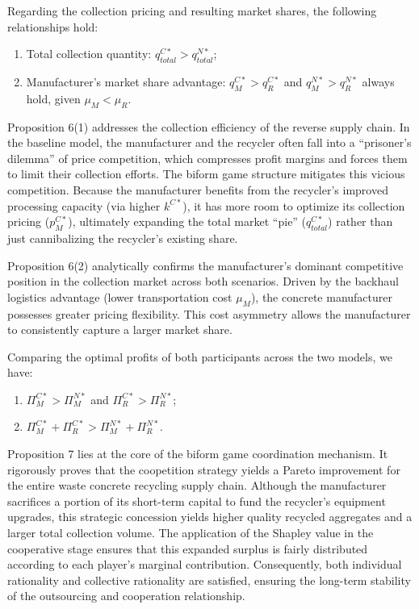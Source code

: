 \documentclass[authoryear,preprint,review,times,10pt]{elsarticle}
\begin{document}
\begin{prop}
\label{prop:pricing_comparison}
Regarding the collection pricing and resulting market shares, the following relationships hold:
\begin{enumerate}[label={(\arabic*)}]
\item Total collection quantity: $q_{total}^{C*} > q_{total}^{N*}$;
\item Manufacturer's market share advantage: $q_{M}^{C*} > q_{R}^{C*}$ and $q_{M}^{N*} > q_{R}^{N*}$ always hold, given $\mu_{M} < \mu_{R}$.
\end{enumerate}
\end{prop}

Proposition 6(1) addresses the collection efficiency of the reverse supply chain. In the baseline model, the manufacturer and the recycler often fall into a ``prisoner's dilemma'' of price competition, which compresses profit margins and forces them to limit their collection efforts. The biform game structure mitigates this vicious competition. Because the manufacturer benefits from the recycler's improved processing capacity (via higher $k^{C*}$), it has more room to optimize its collection pricing ($p_{M}^{C*}$), ultimately expanding the total market ``pie'' ($q_{total}^{C*}$) rather than just cannibalizing the recycler's existing share.

Proposition 6(2) analytically confirms the manufacturer's dominant competitive position in the collection market across both scenarios. Driven by the backhaul logistics advantage (lower transportation cost $\mu_{M}$), the concrete manufacturer possesses greater pricing flexibility. This cost asymmetry allows the manufacturer to consistently capture a larger market share.


\begin{prop}
\label{prop:profit_comparison}
Comparing the optimal profits of both participants across the two models, we have:
\begin{enumerate}[label={(\arabic*)}]
\item $\Pi_{M}^{C*} > \Pi_{M}^{N*}$ and $\Pi_{R}^{C*} > \Pi_{R}^{N*}$;
\item $\Pi_{M}^{C*} + \Pi_{R}^{C*} > \Pi_{M}^{N*} + \Pi_{R}^{N*}$.
\end{enumerate}
\end{prop}

Proposition 7 lies at the core of the biform game coordination mechanism. It rigorously proves that the coopetition strategy yields a Pareto improvement for the entire waste concrete recycling supply chain. Although the manufacturer sacrifices a portion of its short-term capital to fund the recycler's equipment upgrades, this strategic concession yields higher quality recycled aggregates and a larger total collection volume. The application of the Shapley value in the cooperative stage ensures that this expanded surplus is fairly distributed according to each player's marginal contribution. Consequently, both individual rationality and collective rationality are satisfied, ensuring the long-term stability of the outsourcing and cooperation relationship.
\end{document}
